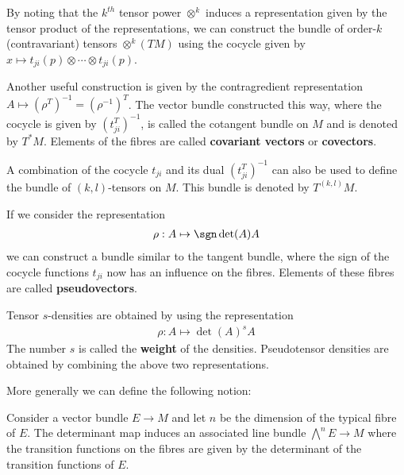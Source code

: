     \begin{example}
        By noting that the $k^{th}$ tensor power $\otimes^k$ induces a representation given by the tensor product of the representations, we can construct the bundle of order-$k$ (contravariant) tensors $\otimes^k(TM)$ using the cocycle given by $x\mapsto t_{ji}(p)\otimes\cdots\otimes t_{ji}(p)$.
    \end{example}
    \begin{example}\label{manifolds:cotangent_bundle}
        Another useful construction is given by the contragredient representation $A\mapsto (\rho^T)^{-1}=(\rho^{-1})^T$. The vector bundle constructed this way, where the cocycle is given by $(t_{ji}^T)^{-1}$, is called the cotangent bundle on $M$ and is denoted by $T^*M$. Elements of the fibres are called \textbf{covariant vectors} or \textbf{covectors}.
    \end{example}
    \begin{notation}
        A combination of the cocycle $t_{ji}$ and its dual $(t_{ji}^T)^{-1}$ can also be used to define the bundle of $(k, l)$-tensors on $M$. This bundle is denoted by $T^{(k, l)}M$.
    \end{notation}

    \begin{example}[Pseudovectors]
        If we consider the representation
        \begin{gather}
            \rho:A\mapsto \sgn\det(A)A
        \end{gather}
        we can construct a bundle similar to the tangent bundle, where the sign of the cocycle functions $t_{ji}$ now has an influence on the fibres. Elements of these fibres are called \textbf{pseudovectors}.
    \end{example}
    \begin{example}
        Tensor $s$-densities are obtained by using the representation
        \begin{gather}
            \rho:A\mapsto \det(A)^sA
        \end{gather}
        The number $s$ is called the \textbf{weight} of the densities. Pseudotensor densities are obtained by combining the above two representations.
    \end{example}

    More generally we can define the following notion:
    \begin{construct}
        Consider a vector bundle $E\rightarrow M$ and let $n$ be the dimension of the typical fibre of $E$. The determinant map induces an associated line bundle $\bigwedge^nE\rightarrow M$ where the transition functions on the fibres are given by the determinant of the transition functions of $E$.
    \end{construct}

